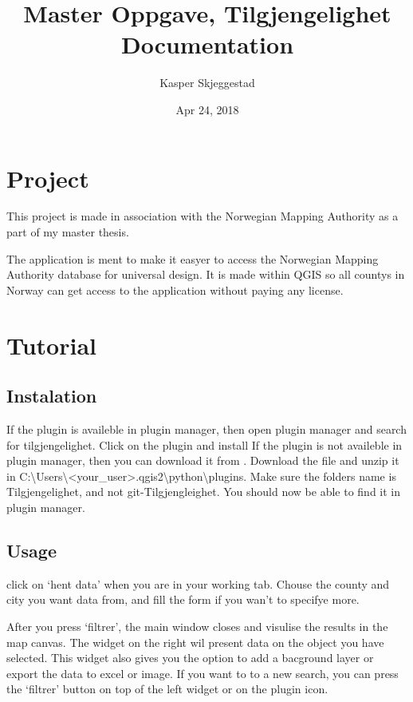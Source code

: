 \documentclass[letterpaper,10pt,english]{sphinxmanual}
\title{Master Oppgave, Tilgjengelighet Documentation}
\date{Apr 24, 2018}
\author{Kasper Skjeggestad}
\begin{document}
\maketitle
\sphinxtableofcontents
{}\label{\detokenize{index::doc}}



\chapter{Project}
\label{\detokenize{project:project}}\label{\detokenize{project:welcome-to-master-oppgave-tilgjengelighet-s-documentation}}\label{\detokenize{project::doc}}
This project is made in association with the Norwegian Mapping Authority as a part of my master thesis.

The application is ment to make it easyer to access the Norwegian Mapping Authority database for universal design. It is made within QGIS so all countys in Norway can get access to the application without paying any license.


\chapter{Tutorial}
\label{\detokenize{tutorial::doc}}\label{\detokenize{tutorial:tutorial}}

\section{Instalation}
\label{\detokenize{tutorial:instalation}}
If the plugin is availeble in plugin manager, then open plugin manager and search for tilgjengelighet. Click on the plugin and install
If the plugin is not availeble in plugin manager, then you can download it from  . Download the file and unzip it in C:\textbackslash{}Users\textbackslash{}\textless{}your\_user\textgreater{}.qgis2\textbackslash{}python\textbackslash{}plugins. Make sure the folders name is Tilgjengelighet, and not git-Tilgjengleighet. You should now be able to find it in plugin manager.


\section{Usage}
\label{\detokenize{tutorial:usage}}
click on ‘hent data’ when you are in your working tab. Chouse the county and city you want data from, and fill the form if you wan’t to specifye more.

After you press ‘filtrer’, the main window closes and visulise the results in the map canvas. The widget on the right wil present data on the object you have selected. This widget also gives you the option to add a bacground layer or export the data to excel or image. If you want to to a new search, you can press the ‘filtrer’ button on top of the left widget or on the plugin icon.
\end{document}
